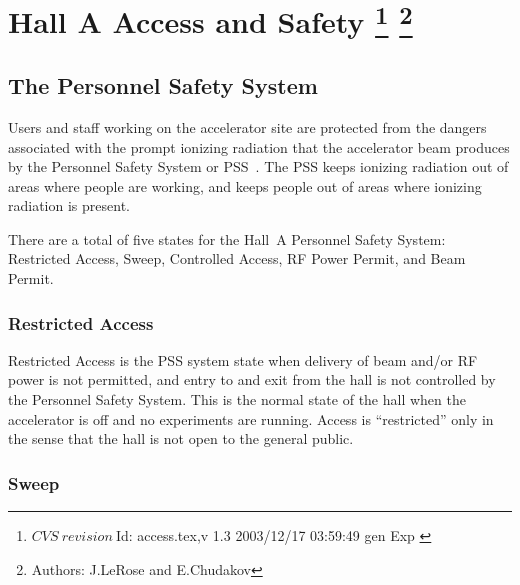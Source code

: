 \chapter[Hall A Access and Safety]{Hall A Access and Safety
\footnote{
  $CVS~revision~ $Id: access.tex,v 1.3 2003/12/17 03:59:49 gen Exp $ $ 
}
\footnote{Authors: J.LeRose  and
                   E.Chudakov }
}
 
\begin{safetyen}{10}{15}
\section{The Personnel Safety System} 
\end{safetyen}

 Users and staff working on the accelerator site are protected from
 the dangers associated with the prompt ionizing radiation that the
 accelerator beam produces by the Personnel Safety System or 
 PSS~\cite{PSScebaf}.
 The PSS keeps ionizing radiation out of areas where people are working,
 and keeps people out of areas where ionizing radiation is present.

 There are a total of five states for the Hall~A Personnel Safety
 System: Restricted Access, Sweep, Controlled Access, RF Power Permit,
 and Beam Permit.

\begin{safetyen}{10}{10}
\subsection{Restricted Access}
\end{safetyen}
 
 Restricted Access is the PSS system state when delivery of beam
 and/or RF power is not permitted, and entry to and exit from the hall
 is not controlled by the Personnel Safety System.  This is the normal
 state of the hall when the accelerator is off and no experiments are
 running.  Access is ``restricted'' only in the sense that the hall is
 not open to the general public.

\begin{safetyen}{10}{10}
\subsection{Sweep}
\end{safetyen}

